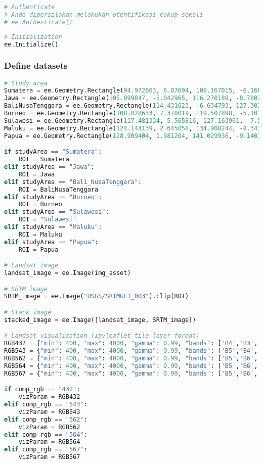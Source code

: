 \begin{lstlisting}[language=Python]
# Authenticate
# Anda dipersilakan melakukan otentifikasi cukup sekali
# ee.Authenticate()
\end{lstlisting}

\begin{lstlisting}[language=Python]
# Initialization
ee.Initialize()
\end{lstlisting}

\hypertarget{define-datasets}{%
\subsubsection{Define datasets}\label{define-datasets}}

\begin{lstlisting}[language=Python]
# Study area
Sumatera = ee.Geometry.Rectangle(94.972663, 6.07694, 109.167015, -6.168225)
Jawa = ee.Geometry.Rectangle(105.099847, -5.042965, 116.270189, -8.78036)
BaliNusaTenggara = ee.Geometry.Rectangle(114.431623, -6.634793, 127.303383, -11.007615)
Borneo = ee.Geometry.Rectangle(108.028633, 7.370019, 119.507898, -5.101769)
Sulawesi = ee.Geometry.Rectangle(117.481334, 5.565816, 127.163961, -7.516092)
Maluku = ee.Geometry.Rectangle(124.144139, 2.645058, 134.908244, -8.347357)
Papua = ee.Geometry.Rectangle(128.909404, 1.081204, 141.029936, -9.140145)

if studyArea == "Sumatera":
    ROI = Sumatera
elif studyArea == "Jawa":
    ROI = Jawa
elif studyArea == "Bali_NusaTenggara":
    ROI = BaliNusaTenggara
elif studyArea == "Borneo":
    ROI = Borneo
elif studyArea == "Sulawesi":
    ROI = "Sulawesi"
elif studyArea == "Maluku":
    ROI = Maluku
elif studyArea == "Papua":
    ROI = Papua

# Landsat image
landsat_image = ee.Image(img_asset)

# SRTM image
SRTM_image = ee.Image("USGS/SRTMGL1_003").clip(ROI)

# Stack image
stacked_image = ee.Image([landsat_image, SRTM_image])

# Landsat visualization (ipyleaflet tile layer format)
RGB432 = {"min": 400, "max": 4000, "gamma": 0.99, "bands": ['B4','B3','B2']}
RGB543 = {"min": 400, "max": 4000, "gamma": 0.99, "bands": ['B5','B4','B3']}
RGB562 = {"min": 400, "max": 4000, "gamma": 0.99, "bands": ['B5','B6','B2']}
RGB564 = {"min": 400, "max": 4000, "gamma": 0.99, "bands": ['B5','B6','B4']}
RGB567 = {"min": 400, "max": 4000, "gamma": 0.99, "bands": ['B5','B6','B7']}

if comp_rgb == "432":
    vizParam = RGB432
elif comp_rgb == "543":
    vizParam = RGB543
elif comp_rgb == "562":
    vizParam = RGB562
elif comp_rgb == "564":
    vizParam = RGB564
elif comp_rgb == "567":
    vizParam = RGB567
\end{lstlisting}

